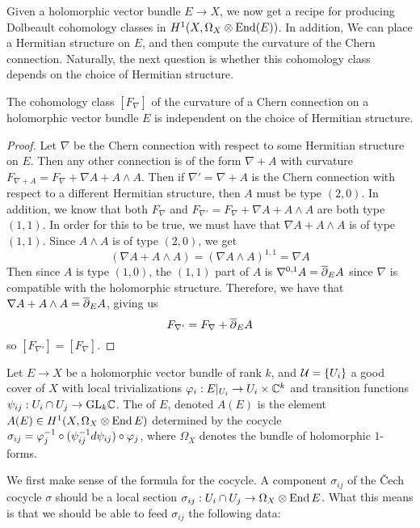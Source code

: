 Given a holomorphic vector bundle $E \to X$, we now get a recipe for producing Dolbeault
cohomology classes in $H^1(X, \Omega_X \otimes \operatorname{End}(E))$. In addition, We can
place a Hermitian structure on $E$, and then compute the curvature of the Chern
connection. Naturally, the next question is whether this cohomology class
depends on the choice of Hermitian structure.
%
\begin{thm}
The cohomology class $[F_\nabla]$ of the curvature of a Chern connection on
a holomorphic vector bundle $E$ is independent on the choice of Hermitian structure.
\end{thm}
%
\begin{proof}
Let $\nabla$ be the Chern connection with respect to some Hermitian structure
on $E$. Then any other connection is of the form $\nabla + A$ with curvature
$F_{\nabla + A} = F_\nabla + \nabla A + A \wedge A$. Then if
$\nabla' = \nabla + A$ is the Chern connection with respect to a different Hermitian
structure, then $A$ must be type $(2,0)$. In addition, we know that both
$F_\nabla$ and $F_{\nabla'} = F_\nabla + \nabla A + A \wedge A$ are both type $(1,1)$.
In order for this to be true, we must have that $\nabla A + A \wedge A$ is
of type $(1,1)$. Since $A \wedge A$ is of type $(2,0)$, we get
\[
(\nabla A + A \wedge A) = (\nabla A \wedge A)^{1,1} = \nabla A
\]
Then since $A$ is type $(1,0)$, the $(1,1)$ part of $A$ is $\nabla^{0,1}A = \overline{\partial}_E A$
since $\nabla$ is compatible with the holomorphic structure. Therefore,
we have that $\nabla A + A \wedge A = \overline{\partial}_E A$, giving us
\[
F_{\nabla'} = F_\nabla + \overline{\partial}_E A
\]
so $[F_{\nabla'}] = [F_\nabla]$.
\end{proof}
%
\begin{defn}
Let $E \to X$ be a holomorphic vector bundle of rank $k$, and
$\mathcal{U} = \left\lbrace U_i \right\rbrace$ a good cover of $X$ with local trivializations
$\varphi_i : E\vert_{U_i} \to U_i \times \mathbb{C}^k$ and transition functions
$\psi_{ij} : U_i \cap U_j \to \mathrm{GL}_k\mathbb{C}$. The  of $E$, denoted
$A(E)$ is the element $A(E) \in H^1(X, \Omega_X \otimes \operatorname{End} E)$ determined by
the cocycle $\sigma_{ij} = \varphi_j^{-1} \circ (\psi_{ij}^{-1} d\psi_{ij}) \circ \varphi_j$,
where $\Omega_X$ denotes the bundle of holomorphic $1$-forms.
\end{defn}
%
We first make sense of the formula for the cocycle. A component $\sigma_{ij}$ of
the \v{C}ech cocycle $\sigma$ should be a local section
$\sigma_{ij} : U_i \cap U_j \to \Omega_X \otimes \operatorname{End} E$. What this means
is that we should be able to feed $\sigma_{ij}$ the following data:
